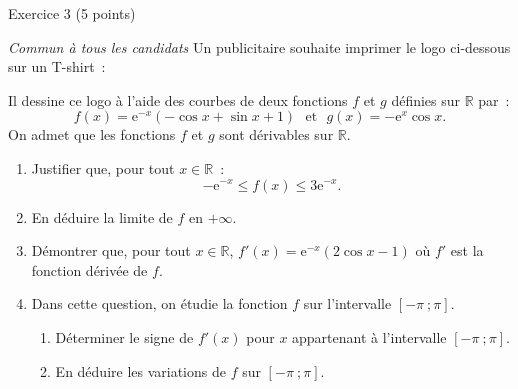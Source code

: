 
\begin{h2}Exercice 3 (5 points)\end{h2}
\smallbreak
\textit{Commun à tous les candidats}
\bigbreak
Un publicitaire souhaite imprimer le logo ci-dessous sur un T-shirt~:
\begin{center}
     \begin{extern}%
     \end{extern}
\end{center}
Il dessine ce logo à l'aide des courbes de deux fonctions $f$ et $g$ définies sur $\mathbb{R}$ par~:
\[
f(x)=\text{e}^{-x}(-\cos x+\sin x+1)\text{~~et~~}
g(x)=-\text{e}^{x}\cos x.
\]
On admet que les fonctions $f$ et $g$ sont dérivables sur $\mathbb{R}$.
\par
\medbreak
{}
\smallbreak
\begin{enumerate}
     \item Justifier que, pour tout $x\in\mathbb{R}$~:\[
     -\text{e}^{-x}\leqslant f(x)\leqslant 3\text{e}^{-x}.\]
     \item En déduire la limite de $f$ en $+\infty$.
     \item Démontrer que, pour tout $x\in\mathbb{R}$, $f'(x)=\text{e}^{-x}(2\cos x-1)$ où $f'$ est la fonction dérivée de $f$.
     \item Dans cette question, on étudie la fonction $f$ sur l'intervalle $[-\pi~;\pi]$.
     \begin{enumerate}[label=\alph*.]
          \item Déterminer le signe de $f'(x)$ pour $x$ appartenant à l'intervalle $[-\pi~;\pi]$.
          \item En déduire les variations de $f$ sur $[-\pi~;\pi]$.
     \end{enumerate}
\end{enumerate}
